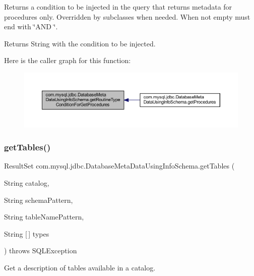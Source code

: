 Returns a condition to be injected in the query that returns metadata for procedures only. Overridden by subclasses when needed. When not empty must end with \char`\"{}\+A\+N\+D \char`\"{}.

\begin{DoxyReturn}{Returns}
String with the condition to be injected. 
\end{DoxyReturn}
Here is the caller graph for this function\+:
\nopagebreak
\begin{figure}[H]
\begin{center}
\leavevmode
\includegraphics[width=350pt]{classcom_1_1mysql_1_1jdbc_1_1_database_meta_data_using_info_schema_a78df26f7bd43db24e251d4b14560fe47_icgraph}
\end{center}
\end{figure}
\mbox{\label{classcom_1_1mysql_1_1jdbc_1_1_database_meta_data_using_info_schema_a77e696e0c2b875ddbf17513a1be3f6a3}} 
\subsubsection{\texorpdfstring{get\+Tables()}{getTables()}}
{\footnotesize\ttfamily Result\+Set com.\+mysql.\+jdbc.\+Database\+Meta\+Data\+Using\+Info\+Schema.\+get\+Tables (\begin{DoxyParamCaption}\item[{String}]{catalog,  }\item[{String}]{schema\+Pattern,  }\item[{String}]{table\+Name\+Pattern,  }\item[{String \mbox{[}$\,$\mbox{]}}]{types }\end{DoxyParamCaption}) throws S\+Q\+L\+Exception}

Get a description of tables available in a catalog. 

